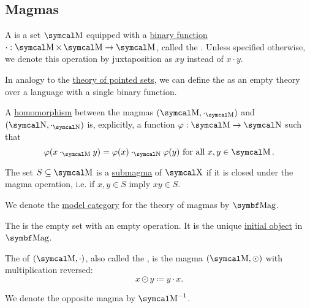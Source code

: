 \subsection{Magmas}\label{subsec:magmas}

\begin{definition}\label{def:magma}
  A  is a set \( \CM \) equipped with a \hyperref[def:function/arity]{binary function} \( \cdot: \CM \times \CM \to \CM \), called the . Unless specified otherwise, we denote this operation by juxtaposition as \( xy \) instead of \( x \cdot y \).

  \begin{DefEnum}
     In analogy to the \hyperref[def:pointed_set/theory]{theory of pointed sets}, we can define the  as an empty theory over a language with a single binary function.

     A \hyperref[def:first_order_homomorphism]{homomorphism} between the magmas \( (\CM, \cdot_{\CM}) \) and \( (\CN, \cdot_{\CN}) \) is, explicitly, a function \( \varphi: \CM \to \CN \) such that
    \begin{equation}\label{eq:def:magma/homomorphism}
      \varphi(x \cdot_{\CM} y) = \varphi(x) \cdot_{\CN} \varphi(y) \Tforall x, y \in \CM.
    \end{equation}

     The set \( S \subseteq \CM \) is a \hyperref[def:first_order_substructure]{submagma} of \( \CX \) if it is closed under the magma operation, i.e. if \( x, y \in S \) imply \( xy \in S \).

     We denote the \hyperref[def:first_order_model_category]{model category} for the theory of magmas by \( \Cat{Mag} \).

     The  is the empty set with an empty operation. It is the unique \hyperref[def:zero_objects/initial]{initial object} in \( \Cat{Mag} \).

     The  of \( (\CM, \cdot) \), also called the , is the magma \( (\CM, \odot) \) with multiplication reversed:
    \begin{equation*}
      x \odot y \coloneqq y \cdot x.
    \end{equation*}

    We denote the opposite magma by \( \CM^{-1} \).


\end{DefEnum}
\end{definition}
